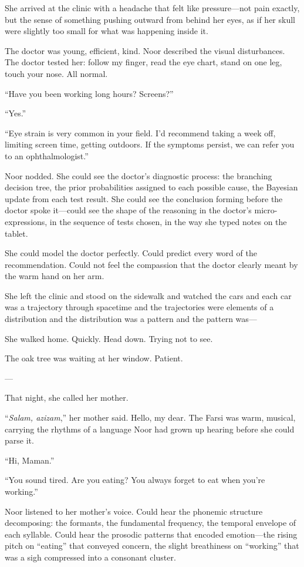 She arrived at the clinic with a headache that felt like pressure---not pain exactly, but the sense of something pushing outward from behind her eyes, as if her skull were slightly too small for what was happening inside it.

The doctor was young, efficient, kind. Noor described the visual disturbances. The doctor tested her: follow my finger, read the eye chart, stand on one leg, touch your nose. All normal.

``Have you been working long hours? Screens?''

``Yes.''

``Eye strain is very common in your field. I'd recommend taking a week off, limiting screen time, getting outdoors. If the symptoms persist, we can refer you to an ophthalmologist.''

Noor nodded. She could see the doctor's diagnostic process: the branching decision tree, the prior probabilities assigned to each possible cause, the Bayesian update from each test result. She could see the conclusion forming before the doctor spoke it---could see the shape of the reasoning in the doctor's micro-expressions, in the sequence of tests chosen, in the way she typed notes on the tablet.

She could model the doctor perfectly. Could predict every word of the recommendation. Could not feel the compassion that the doctor clearly meant by the warm hand on her arm.

She left the clinic and stood on the sidewalk and watched the cars and each car was a trajectory through spacetime and the trajectories were elements of a distribution and the distribution was a pattern and the pattern was---

She walked home. Quickly. Head down. Trying not to see.

The oak tree was waiting at her window. Patient.

---

That night, she called her mother.

``\textit{Salam, azizam},'' her mother said. Hello, my dear. The Farsi was warm, musical, carrying the rhythms of a language Noor had grown up hearing before she could parse it.

``Hi, Maman.''

``You sound tired. Are you eating? You always forget to eat when you're working.''

Noor listened to her mother's voice. Could hear the phonemic structure decomposing: the formants, the fundamental frequency, the temporal envelope of each syllable. Could hear the prosodic patterns that encoded emotion---the rising pitch on ``eating'' that conveyed concern, the slight breathiness on ``working'' that was a sigh compressed into a consonant cluster.

